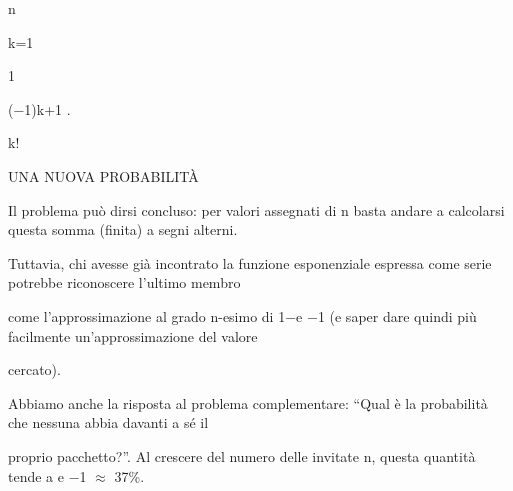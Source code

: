 \documentclass[a4paper,portrait,12pt]{article}
\begin{document}
\begin{flushleft}
n
\end{flushleft}


\begin{flushleft}
k=1
\end{flushleft}





1


\begin{flushleft}
($-$1)k+1 .
\end{flushleft}


\begin{flushleft}
k!
\end{flushleft}










\begin{flushleft}
UNA NUOVA PROBABILIT\`{A}
\end{flushleft}





\begin{flushleft}
Il problema pu\`{o} dirsi concluso: per valori assegnati di n basta andare a calcolarsi questa somma (finita) a segni alterni.
\end{flushleft}


\begin{flushleft}
Tuttavia, chi avesse gi\`{a} incontrato la funzione esponenziale espressa come serie potrebbe riconoscere l'ultimo membro
\end{flushleft}


\begin{flushleft}
come l'approssimazione al grado n-esimo di 1$-$e $-$1 (e saper dare quindi più facilmente un'approssimazione del valore
\end{flushleft}


\begin{flushleft}
cercato).
\end{flushleft}


\begin{flushleft}
Abbiamo anche la risposta al problema complementare: {``}Qual \`{e} la probabilit\`{a} che nessuna abbia davanti a s\'{e} il
\end{flushleft}


\begin{flushleft}
proprio pacchetto?''. Al crescere del numero delle invitate n, questa quantit\`{a} tende a e $-$1 $\approx$ 37\%.
\end{flushleft}
\end{document}
